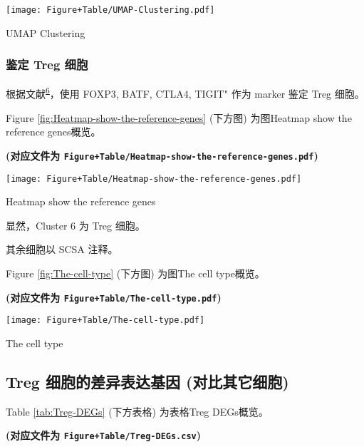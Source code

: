 \documentclass[
]{article}
\begin{document}
\def\@captype{figure}
\begin{center}
\texttt{[image: Figure+Table/UMAP-Clustering.pdf]}
\caption{UMAP Clustering}\label{fig:UMAP-Clustering}
\end{center}

\hypertarget{t1-treg}{%
\subsubsection{鉴定 Treg 细胞}\label{t1-treg}}

根据文献\textsuperscript{\protect\hyperlink{ref-SingleCellSeqKrishn2021}{6}}，使用 FOXP3, BATF, CTLA4, TIGIT" 作为 marker 鉴定 Treg 细胞。

Figure \ref{fig:Heatmap-show-the-reference-genes} (下方图) 为图Heatmap show the reference genes概览。

\textbf{(对应文件为 \texttt{Figure+Table/Heatmap-show-the-reference-genes.pdf})}

\def\@captype{figure}
\begin{center}
\texttt{[image: Figure+Table/Heatmap-show-the-reference-genes.pdf]}
\caption{Heatmap show the reference genes}\label{fig:Heatmap-show-the-reference-genes}
\end{center}

显然，Cluster 6 为 Treg 细胞。

其余细胞以 SCSA 注释。

Figure \ref{fig:The-cell-type} (下方图) 为图The cell type概览。

\textbf{(对应文件为 \texttt{Figure+Table/The-cell-type.pdf})}

\def\@captype{figure}
\begin{center}
\texttt{[image: Figure+Table/The-cell-type.pdf]}
\caption{The cell type}\label{fig:The-cell-type}
\end{center}

\hypertarget{treg-ux7ec6ux80deux7684ux5deeux5f02ux8868ux8fbeux57faux56e0-ux5bf9ux6bd4ux5176ux5b83ux7ec6ux80de}{%
\subsection{Treg 细胞的差异表达基因 (对比其它细胞)}\label{treg-ux7ec6ux80deux7684ux5deeux5f02ux8868ux8fbeux57faux56e0-ux5bf9ux6bd4ux5176ux5b83ux7ec6ux80de}}

Table \ref{tab:Treg-DEGs} (下方表格) 为表格Treg DEGs概览。

\textbf{(对应文件为 \texttt{Figure+Table/Treg-DEGs.csv})}
\end{document}
